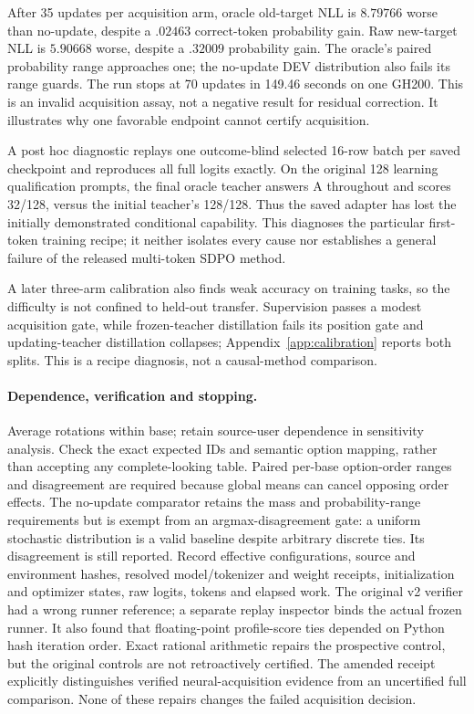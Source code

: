 \documentclass{article}
\begin{document}
After 35 updates per acquisition arm, oracle old-target NLL is $8.79766$ worse
than no-update, despite a $.02463$ correct-token probability gain. Raw new-target
NLL is $5.90668$ worse, despite a $.32009$ probability gain. The oracle's paired
probability range approaches one; the no-update DEV distribution also fails
its range guards. The run stops at 70 updates in 149.46 seconds on one GH200.
This is an invalid acquisition assay, not a negative result for residual
correction. It illustrates why one favorable endpoint cannot certify acquisition.

A post hoc diagnostic replays one outcome-blind selected 16-row batch per saved
checkpoint and reproduces all full logits exactly. On the original 128
learning qualification prompts, the final oracle teacher answers A throughout
and scores 32/128, versus the initial teacher's 128/128. Thus the saved adapter
has lost the initially demonstrated conditional capability. This diagnoses the
particular first-token training recipe; it neither isolates every cause nor
establishes a general failure of the released multi-token SDPO method.

A later three-arm calibration also finds weak accuracy on training tasks,
so the difficulty is not confined to held-out transfer. Supervision passes a
modest acquisition gate, while frozen-teacher distillation fails its position
gate and updating-teacher distillation collapses; Appendix~\ref{app:calibration}
reports both splits. This is a recipe diagnosis, not a causal-method comparison.

\paragraph{Dependence, verification and stopping.}
Average rotations within base; retain source-user dependence in sensitivity
analysis. Check the exact expected IDs and semantic option mapping, rather
than accepting any complete-looking table. Paired per-base option-order ranges
and disagreement are required because global means can cancel opposing order
effects. The no-update comparator retains the mass and probability-range
requirements but is exempt from an argmax-disagreement gate: a uniform
stochastic distribution is a valid baseline despite arbitrary discrete ties.
Its disagreement is still reported. Record effective configurations, source and environment hashes,
resolved model/tokenizer and weight receipts, initialization and optimizer
states, raw logits, tokens and elapsed work. The original v2 verifier had a
wrong runner reference; a separate replay inspector binds the actual frozen
runner. It also found that floating-point profile-score ties depended on Python
hash iteration order. Exact rational arithmetic repairs the prospective control,
but the original controls are not retroactively certified. The amended receipt
explicitly distinguishes verified neural-acquisition evidence from an uncertified
full comparison. None of these repairs changes the failed acquisition decision.
\end{document}
